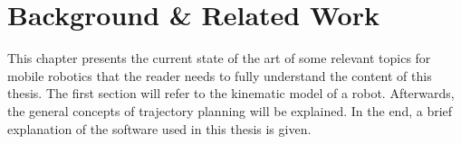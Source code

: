 

\chapter{\textbf{Background \&  Related Work}}

This chapter presents the current state of the art of some relevant topics for mobile robotics that the reader needs to fully understand the content of this thesis. The first section will refer to the kinematic model of a robot. Afterwards, the general concepts of trajectory planning will be explained. In the end, a brief explanation of the software used in this thesis is given.

